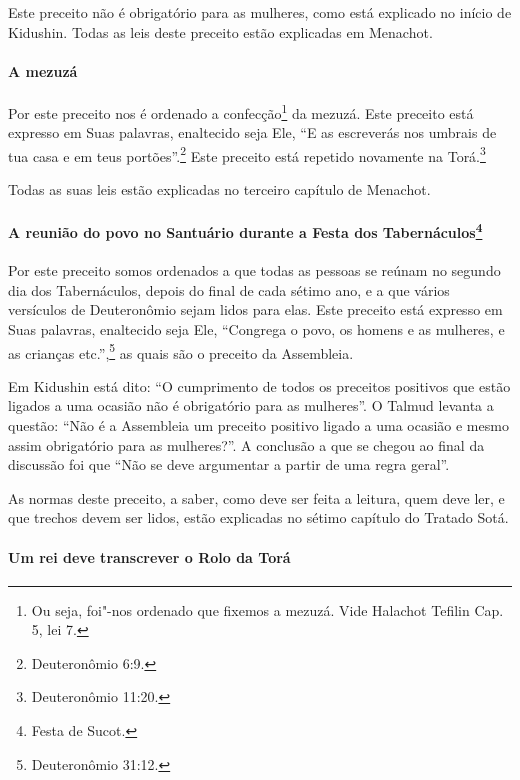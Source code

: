 \begin{multicols}{2}
Este preceito não é obrigatório para as mulheres, como está explicado no
início de Kidushin\starr. Todas as leis deste preceito estão explicadas em
Menachot\starr.

\paragraph{A mezuzá\starr}

Por este preceito nos é ordenado a confecção\footnote{Ou seja, foi"-nos ordenado que fixemos a mezuzá\starr. Vide Halachot Tefilin\starr{} Cap. 5, lei 7.} da
mezuzá\starr. Este
preceito está expresso em Suas palavras, enaltecido seja Ele, ``E as
escreverás
nos umbrais de tua casa e em teus portões''.\footnote{Deuteronômio 6:9.} Este
preceito está repetido novamente na Torá\starr.\footnote{Deuteronômio 11:20.}

Todas as suas leis estão explicadas no terceiro capítulo de Menachot\starr.

\paragraph{A reunião do povo no Santuário durante a Festa dos
Tabernáculos\protect\footnote{Festa de Sucot\starr.}}

Por este preceito somos ordenados a que todas as pessoas se reúnam no
segundo dia dos Tabernáculos, depois do final de cada sétimo ano, e a
que vários versículos de Deuteronômio sejam lidos para elas. Este
preceito está expresso em Suas palavras, enaltecido seja Ele, ``Congrega
o povo, os homens e as mulheres, e as crianças etc.'',\footnote{Deuteronômio
31:12.} as quais são o preceito da Assembleia.

Em Kidushin\starr{} está dito: ``O cumprimento de todos os preceitos positivos
que estão ligados a uma ocasião não é obrigatório para as mulheres''. O
Talmud\starr{} levanta a questão: ``Não é a Assembleia um preceito positivo
ligado a uma ocasião e mesmo assim obrigatório para as mulheres?''. A
conclusão a que se chegou ao final da discussão foi que ``Não se deve
argumentar a partir de uma regra geral''.

As normas deste preceito, a saber, como deve ser feita a leitura, quem
deve ler, e que trechos devem ser lidos, estão explicadas no sétimo
capítulo do Tratado Sotá\starr.

\paragraph{Um rei deve transcrever o Rolo da Torá\starr{}}


\end{multicols}
